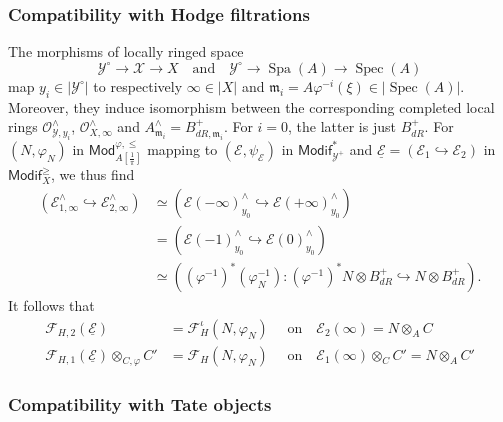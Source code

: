 \documentclass[11pt]{article}
\theoremstyle{definition}
\numberwithin{equation}{section}
\numberwithin{figure}{section}
\numberwithin{table}{section}
\newcommand{\Mod}{\mathsf{Mod}}
\newcommand{\Modif}{\mathsf{Modif}}
\DeclareMathOperator{\Spec}{Spec}
\DeclareMathOperator{\Spa}{Spa}
\newcommand*{\dR}{dR}
\begin{document}
\subsubsection{Compatibility with Hodge filtrations}\label{subsec:CompHodge}

The morphisms of locally ringed space
\[
\mathscr{Y}^{\circ}\rightarrow\mathscr{X}\rightarrow X\quad\text{and}\quad\mathscr{Y}^{\circ}\rightarrow\Spa(A)\rightarrow\Spec(A)
\]
map $y_{i}\in\left|\mathscr{Y}^{\circ}\right|$ to respectively $\infty\in\left|X\right|$ and $\mathfrak{m}_{i}=A\varphi^{-i}(\xi)\in\left|\Spec(A)\right|$. Moreover, they induce isomorphism between the corresponding completed local rings $\mathscr{O}_{\mathscr{Y},y_{i}}^{\wedge}$, $\mathcal{O}_{X,\infty}^{\wedge}$ and $A_{\mathfrak{m}_{i}}^{\wedge}=B_{\dR,\mathfrak{m}_{i}}^{+}$. For $i=0$, the latter is just $B_{\dR}^{+}$. For $(N,\varphi_{N})$ in $\Mod_{A[\frac{1}{\pi}]}^{\varphi,\leq}$ mapping to $(\mathscr{E},\psi_{\mathscr{E}})$ in $\Modif_{\mathscr{Y}^{+}}^{\ast}$ and $\underline{\mathcal{E}}=(\mathcal{E}_{1}\hookrightarrow\mathcal{E}_{2})$ in $\Modif_{X}^{\geq}$, we thus find
\begin{align*}
\left(\mathcal{E}_{1,\infty}^{\wedge}\hookrightarrow\mathcal{E}_{2,\infty}^{\wedge}\right) & \simeq \left(\mathscr{\mathscr{E}}(-\infty)_{y_{0}}^{\wedge}\hookrightarrow\mathscr{\mathscr{E}}(+\infty)_{y_{0}}^{\wedge}\right)\\
& = \left(\mathscr{\mathscr{E}}(-1)_{y_{0}}^{\wedge}\hookrightarrow\mathscr{\mathscr{E}}(0)_{y_{0}}^{\wedge}\right)\\
& \simeq \left((\varphi^{-1})^{\ast}(\varphi_{N}^{-1}):(\varphi^{-1})^{\ast}N\otimes B_{\dR}^{+}\hookrightarrow N\otimes B_{\dR}^{+}\right).
\end{align*}
It follows that
\begin{align*}
\mathcal{F}_{H,2}(\underline{\mathcal{E}}) & = \mathcal{F}_{H}^{\iota}(N,\varphi_{N})\quad\text{ on}\quad\mathcal{E}_{2}(\infty)=N\otimes_{A}C\\
\mathcal{F}_{H,1}(\underline{\mathcal{E}})\otimes_{C,\varphi}C' & = \mathcal{F}_{H}(N,\varphi_{N})\quad\text{ on}\quad\mathcal{E}_{1}(\infty)\otimes_{C}C'=N\otimes_{A}C'
\end{align*}


\subsubsection{Compatibility with Tate objects}\label{subsec:CompTate}
\end{document}
